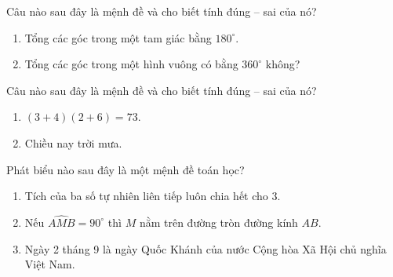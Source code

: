 \begin{bt}%
	Câu nào sau đây là mệnh đề và cho biết tính đúng – sai của nó?
	\begin{enumerate}
		\item Tổng các góc trong một tam giác bằng $180^\circ$.
		\item Tổng các góc trong một hình vuông có bằng $360^\circ$ không?
	\end{enumerate}
\end{bt}

\begin{bt}%
	Câu nào sau đây là mệnh đề và cho biết tính đúng – sai của nó?
	\begin{enumerate}
		\item $\left(3+4\right)\left(2+6\right)=73$.
		\item Chiều nay trời mưa.
	\end{enumerate}
\end{bt}

\begin{bt}%
	Phát biểu nào sau đây là một mệnh đề toán học?
	\begin{enumerate}
		\item Tích của ba số tự nhiên liên tiếp luôn chia hết cho $3$.
		\item Nếu $\widehat{AMB}=90^\circ$ thì $M$ nằm trên đường tròn đường kính $AB$.
		\item Ngày 2 tháng 9 là ngày Quốc Khánh của nước Cộng hòa Xã Hội chủ nghĩa Việt Nam.
	\end{enumerate}
\end{bt}

